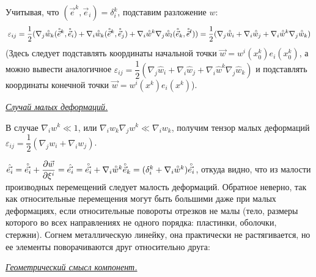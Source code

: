 Учитывая, что $(\vec e^k,\vec e_i) = \delta_i^k$, подставим разложение $w$:
$$
\varepsilon_{ij} = \dfrac{1}{2}(\nabla_j\accentset{\circ}{w}_k(\accentset{\circ}{\vec e}^k, \accentset{\circ}{\vec e}_i) + \nabla_i\accentset{\circ}{w}_k(\accentset{\circ}{\vec e}^k, \accentset{\circ}{\vec e}_j) + \nabla_i\accentset{\circ}{w}^k \nabla_j\accentset{\circ}{w}_l(\accentset{\circ}{\vec e}_k, \accentset{\circ}{\vec e}^l)) = \dfrac{1}{2}(\nabla_j\accentset{\circ}{w}_i + \nabla_i\accentset{\circ}{w}_j + 
\nabla_i\accentset{\circ}{w}^k \nabla_j\accentset{\circ}{w}_k)
$$
(Здесь следует подставлять координаты начальной точки $\vec w = w^i(x_0^k)e_i(x_0^k)$, а можно вывести аналогичное $\varepsilon_{ij} = \dfrac{1}{2}(\nabla_j\hat {w}_i + \nabla_i\hat {w}_j + 
\nabla_i\hat {w}^k \nabla_j\hat {w}_k)$ и подставлять координаты конечной точки $\vec w = w^i(x^k)e_i(x^k)$).

\begin{center}
	\textit{\underline{Случай малых деформаций.}}
\end{center}

В случае $\nabla_i {w}^k \ll 1$, или $\nabla_i {w}_k\nabla_j {w}^k \ll \nabla_i {w}_k$, получим тензор малых деформаций $\varepsilon_{ij} = \dfrac{1}{2}(\nabla_j {w}_i + \nabla_i {w}_j)$.

$\hat{\vec{e_i}} = \accentset{\circ}{\vec{e_i}} +\dfrac{\partial\vec w}{\partial\xi^i} = \hat{\vec{e_i}} = \accentset{\circ}{\vec{e_i}} +\nabla_i\accentset{\circ}{w}^k\accentset{\circ}{\vec e}_k = (\delta_i^k + \nabla_i\accentset{\circ}{w}^k)\accentset{\circ}{\vec{e_i}}$, откуда видно, что из малости производных перемещений следует малость деформаций. Обратное неверно, так как относительные перемещения могут быть большими даже при малых деформациях, если относительные повороты отрезков не малы (тело, размеры которого во всех направлениях не одного порядка: пластинки, оболочки, стержни). Согнем металлическую линейку, она практически не растягивается, но ее элементы поворачиваются друг относительно друга:
\begin{figure}[H]
	\centering{}
	\label{fig2}
\end{figure}

\begin{center}
	\textit{\underline{Геометрический смысл компонент.}}
\end{center}

